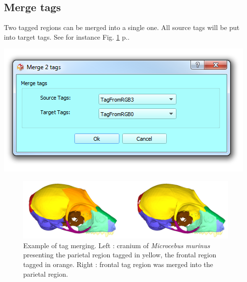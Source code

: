 \subsection{Merge tags}
\noindent
\begin{minipage}{0.5\textwidth}
Two tagged regions can be merged into a single one. All source tags will be put into target tags. See for instance Fig. \ref{merge_tags} p.\pageref{merge_tags}.\end{minipage}    
\begin{minipage}{0.5\textwidth}\centering
  \includegraphics[scale=0.5]{images/12/merge_tags.png}
 \end{minipage} 
\noindent
\begin{figure}
  \centering
  \includegraphics[scale=0.25]{images/12/merge_example.png} 
	\caption{Example of tag merging. Left : cranium of \textit{Microcebus murinus} presenting the parietal region
tagged in yellow, the frontal region tagged in orange. Right : frontal tag region was merged into
the parietal region.}
\label{merge_tags}
\end{figure}